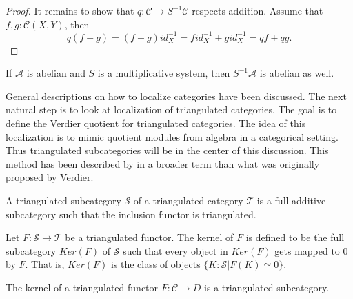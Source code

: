 \begin{proof}
        It remains to show that $q:\mathcal{C}\rightarrow S^{-1}\mathcal{C}$ respects addition. Assume that $f,g:\mathcal{C}(X,Y)$, then
        \begin{equation*}
            q(f+g)=(f+g)id_X^{-1}=fid_X^{-1}+gid_X^{-1}=qf+qg.
        \end{equation*}
    \end{proof}

    \begin{corollary}
        If $\mathcal{A}$ is abelian and $S$ is a multiplicative system, then $S^{-1}\mathcal{A}$ is abelian as well.
    \end{corollary}

    General descriptions on how to localize categories have been discussed. The next natural step is to look at localization of triangulated categories. The goal is to define the Verdier quotient for triangulated categories. The idea of this localization is to mimic quotient modules from algebra in a categorical setting. Thus triangulated subcategories will be in the center of this discussion. This method has been described by \cite{neeman} in a broader term than what was originally proposed by Verdier.

    \begin{definition}
        A triangulated subcategory $\mathcal{S}$ of a triangulated category $\mathcal{T}$ is a full additive subcategory such that the inclusion functor is triangulated.
    \end{definition}

    \begin{definition}
        Let $F : \mathcal{S} \rightarrow \mathcal{T}$ be a triangulated functor. The kernel of $F$ is defined to be the full subcategory $Ker(F)$ of $\mathcal{S}$ such that every object in $Ker(F)$ gets mapped to $0$ by $F$. That is, $Ker(F)$ is the class of objects $\{K : \mathcal{S} | F(K)\simeq 0\}$.
    \end{definition}

    \begin{lemma}
        The kernel of a triangulated functor $F:\mathcal{C}\rightarrow{D}$ is a triangulated subcategory.
    \end{lemma}

